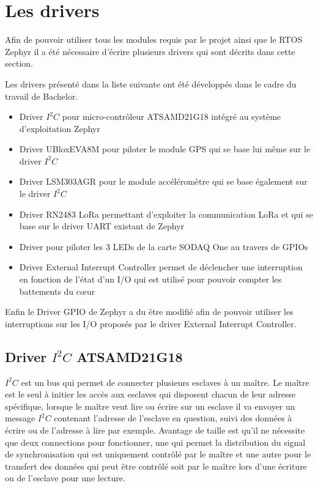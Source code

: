 \section{Les drivers}\label{ch:drivers}

Afin de pouvoir utiliser tous les modules requis par le projet ainsi que le RTOS Zephyr il a été nécessaire d'écrire plusieurs drivers qui sont décrits dans cette section.

Les drivers présenté dans la liste suivante ont été développés dans le cadre du travail de Bachelor.

\begin{itemize}
\item Driver $I^{2}C$ pour micro-contrôleur ATSAMD21G18 intégré au système d'exploitation Zephyr
\item Driver UBloxEVA8M pour piloter le module GPS qui se base lui même sur le driver $I^{2}C$
\item Driver LSM303AGR pour le module accéléromètre qui se base également sur le driver  $I^{2}C$
\item Driver RN2483 LoRa permettant d'exploiter la communication LoRa et qui se base sur le driver UART existant de Zephyr
\item Driver pour piloter les 3 LEDs de la carte SODAQ One au travers de GPIOs
\item Driver External Interrupt Controller permet de déclencher une interruption en fonction de l'état d'un I/O qui est utilisé pour pouvoir compter les battements du cœur
\end{itemize}

Enfin le Driver GPIO de Zephyr a du être modifié afin de pouvoir utiliser les interruptions sur les I/O proposés par le driver External Interrupt Controller.

\subsection{Driver $I^{2}C$ ATSAMD21G18}

$I^{2}C$ est un bus qui permet de connecter plusieurs esclaves à un maître. Le maître est le seul à initier les accès aux esclaves qui disposent chacun de leur adresse spécifique, lorsque le maître veut lire ou écrire sur un esclave il va envoyer un message $I^{2}C$ contenant l'adresse de l'esclave en question, suivi des données à écrire ou de l'adresse à lire par exemple. Avantage de taille est qu'il ne nécessite que deux connections pour fonctionner, une qui permet la distribution du signal de synchronisation qui est uniquement contrôlé par le maître et une autre pour le transfert des données qui peut être contrôlé soit par le maître lors d'une écriture ou de l'esclave pour une lecture.

